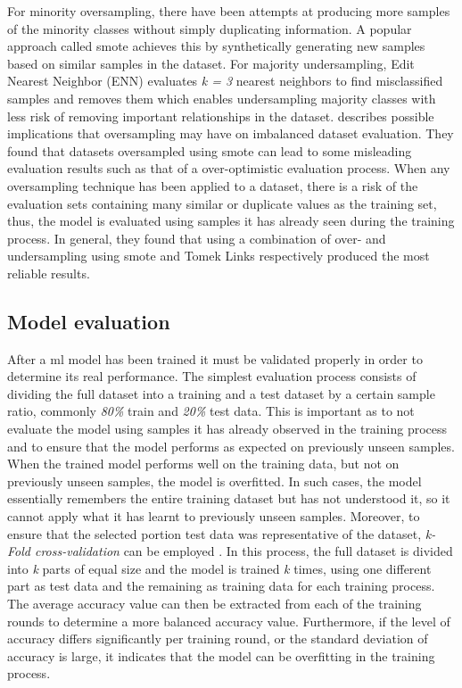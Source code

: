 For minority oversampling, there have been attempts at producing more samples of the minority classes without simply duplicating information. A popular approach called \acrfull{smote} \parencite{Chawla2002} achieves this by synthetically generating new samples based on similar samples in the dataset. For majority undersampling, Edit Nearest Neighbor (ENN) evaluates \textit{k = 3} nearest neighbors to find misclassified samples and removes them which enables undersampling majority classes with less risk of removing important relationships in the dataset. \cite{cv_imbalance} describes possible implications that oversampling may have on imbalanced dataset evaluation. They found that datasets oversampled using \acrshort{smote} can lead to some misleading evaluation results such as that of a over-optimistic evaluation process. When any oversampling technique has been applied to a dataset, there is a risk of the evaluation sets containing many similar or duplicate values as the training set, thus, the model is evaluated using samples it has already seen during the training process. In general, they found that using a combination of over- and undersampling using \acrshort{smote} and Tomek Links \parencite{tomek} respectively produced the most reliable results.

\subsection{Model evaluation}
\label{sec:model_evaluation}

After a \acrfull{ml} model has been trained it must be validated properly in order to determine its real performance. The simplest evaluation process consists of dividing the full dataset into a training and a test dataset by a certain sample ratio, commonly \textit{80\%} train and \textit{20\%} test data. This is important as to not evaluate the model using samples it has already observed in the training process and to ensure that the model performs as expected on previously unseen samples. When the trained model performs well on the training data, but not on previously unseen samples, the model is overfitted. In such cases, the model essentially remembers the entire training dataset but has not understood it, so it cannot apply what it has learnt to previously unseen samples. Moreover, to ensure that the selected portion test data was representative of the dataset, \textit{k-Fold cross-validation} can be employed \parencite{ghojogh2019theory}. In this process, the full dataset is divided into \textit{k} parts of equal size and the model is trained \textit{k} times, using one different part as test data and the remaining as training data for each training process. The average accuracy value can then be extracted from each of the training rounds to determine a more balanced accuracy value. Furthermore, if the level of accuracy differs significantly per training round, or the standard deviation of accuracy is large, it indicates that the model can be overfitting in the training process.
